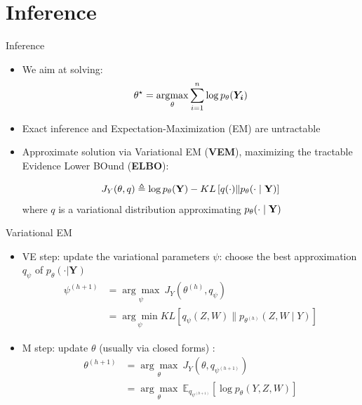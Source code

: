 \documentclass{beamer}
\theoremstyle{remark}
\DeclareMathOperator*{\argmax}{\arg\!\max}
\begin{document}
\section{Inference}
\begin{frame}{Inference}
    \begin{itemize}
        \item We aim at solving:
\vspace{-0.6cm}
    \begin{equation*}  \label{MLEequation}
    \mathversion{bold}
 \theta^{\star} = \argmax _{\theta} \sum _{i =1} ^n \operatorname{log} p_{\theta}(\boldsymbol{Y_i})\end{equation*}
    \item Exact inference and Expectation-Maximization (EM) are untractable
    \item Approximate solution via Variational EM (\textbf{VEM}), maximizing the tractable Evidence Lower BOund (\textbf{ELBO}):

     \begin{equation*}
     J_Y(\theta, q) \triangleq \log p_{\theta}(\boldsymbol{\mathbf{Y}})-K L\left[q(\cdot) \|  p_{\theta}(\cdot \mid   \boldsymbol{\mathbf{Y}})\right]
\end{equation*}
where $q$ is a variational distribution approximating $p_{\theta}(\cdot \mid \boldsymbol{\mathbf{Y}})$
\end{itemize}
\end{frame}

\begin{frame}{Variational EM}
\begin{itemize}
    \item VE step: update the variational parameters $\psi$: choose the best approximation $q_{\psi}$ of $p_{\theta}(\cdot |\boldsymbol Y)$
        \begin{align*}
            \psi^{(h+1)}& =\underset{\psi }{\arg \max } ~ J_Y(\theta^{(h)}, q_{\psi})\\
                        & =\underset{\psi }{\arg \min } K L\left[q_{\psi}(Z,W) \| p_{\theta^{(h)}}(Z,W \mid Y)\right]
\end{align*}
    \item M step: update $\theta$ (usually via closed forms) :
        \begin{align*}
            \theta^{(h+1)}& =\underset{\theta}{\arg \max } ~ J_Y(\theta, q_{\psi^{(h+1)}})\\
                          & =\underset{\theta}{\arg \max } ~   \mathbb{E}_{q_{\psi^{(h+1)}}}\left[\log p_{\theta}(Y, Z,W)\right]
\end{align*}
\end{itemize}
\end{frame}
\end{document}
